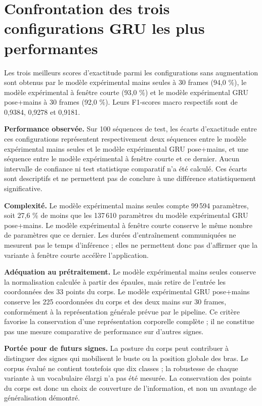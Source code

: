 \section{Confrontation des trois configurations GRU les plus performantes}

Les trois meilleurs scores d'exactitude parmi les configurations sans augmentation sont obtenus par le modèle expérimental mains seules à 30 frames (94,0 \%), le modèle expérimental à fenêtre courte (93,0 \%) et le modèle expérimental GRU pose+mains à 30 frames (92,0 \%). Leurs F1-scores macro respectifs sont de 0,9384, 0,9278 et 0,9181.

\noindent\textbf{Performance observée.}
Sur 100 séquences de test, les écarts d'exactitude entre ces configurations représentent respectivement deux séquences entre le modèle expérimental mains seules et le modèle expérimental GRU pose+mains, et une séquence entre le modèle expérimental à fenêtre courte et ce dernier. Aucun intervalle de confiance ni test statistique comparatif n'a été calculé. Ces écarts sont descriptifs et ne permettent pas de conclure à une différence statistiquement significative.

\noindent\textbf{Complexité.}
Le modèle expérimental mains seules compte 99\,594 paramètres, soit 27,6 \% de moins que les 137\,610 paramètres du modèle expérimental GRU pose+mains. Le modèle expérimental à fenêtre courte conserve le même nombre de paramètres que ce dernier. Les durées d'entraînement communiquées ne mesurent pas le temps d'inférence ; elles ne permettent donc pas d'affirmer que la variante à fenêtre courte accélère l'application.

\noindent\textbf{Adéquation au prétraitement.}
Le modèle expérimental mains seules conserve la normalisation calculée à partir des épaules, mais retire de l'entrée les coordonnées des 33 points du corps. Le modèle expérimental GRU pose+mains conserve les 225 coordonnées du corps et des deux mains sur 30 frames, conformément à la représentation générale prévue par le pipeline. Ce critère favorise la conservation d'une représentation corporelle complète ; il ne constitue pas une mesure comparative de performance sur d'autres signes.

\noindent\textbf{Portée pour de futurs signes.}
La posture du corps peut contribuer à distinguer des signes qui mobilisent le buste ou la position globale des bras. Le corpus évalué ne contient toutefois que dix classes ; la robustesse de chaque variante à un vocabulaire élargi n'a pas été mesurée. La conservation des points du corps est donc un choix de couverture de l'information, et non un avantage de généralisation démontré.

